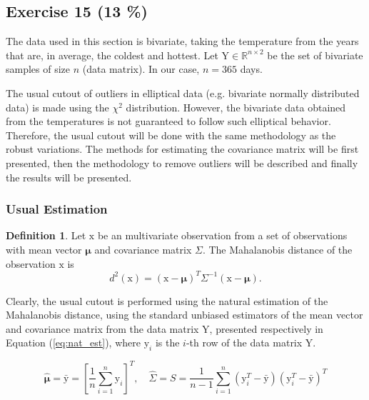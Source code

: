 \documentclass[11pt]{article}
\theoremstyle{definition}
\newtheorem{definition}{Definition}[section]
\theoremstyle{remark}
\theoremstyle{remark}
\begin{document}
\subsection*{Exercise 15 (13 \%)}
The data used in this section is bivariate, taking the temperature
from the years that are, in average, the coldest and hottest. Let
$\boldsymbol{\mathrm{Y}}\in\mathbb{R}^{n\times2}$ be the set of
bivariate samples of size $n$ (data matrix). In our case, $n=365$
days.


The usual cutout of outliers in elliptical data (e.g. bivariate
normally distributed data) is made using the $\chi^2$
distribution. However, the bivariate data obtained from the
temperatures is not guaranteed to follow such elliptical
behavior. Therefore, the usual cutout will be done with the same
methodology as the robust variations. The methods for estimating the
covariance matrix will be first presented, then the methodology to
remove outliers will be described and finally the results will be
presented.

\subsubsection*{Usual Estimation}
\begin{definition}
  Let $\boldsymbol{\mathrm{x}}$ be an multivariate observation from a
  set of observations with mean vector $\boldsymbol{\mu}$ and
  covariance matrix $\Sigma$. The Mahalanobis distance of the
  observation $\boldsymbol{\mathrm{x}}$ is
\begin{equation}\label{eq:mahal}
  d^2(\boldsymbol{\mathrm{x}}) = (\boldsymbol{\mathrm{x}} - \boldsymbol{\mu})^T\Sigma^{-1}(\boldsymbol{\mathrm{x}} - \boldsymbol{\mu}).
\end{equation}

\end{definition}

Clearly, the usual cutout is performed using the natural estimation of
the Mahalanobis distance, using the standard unbiased estimators of
the mean vector and covariance matrix from the data matrix
$\boldsymbol{\mathrm{Y}}$, presented respectively in Equation
(\ref{eq:nat_est}), where $\boldsymbol{\mathrm{y}}_i$ is the $i$-th
row of the data matrix $\boldsymbol{\mathrm{Y}}$.

\begin{equation}\label{eq:nat_est}
  \hat{\boldsymbol\mu}=\bar{\boldsymbol{\mathrm{y}}}=\left[\dfrac{1}{n}\sum_{i=1}^{n}\boldsymbol{\mathrm{y}}_i\right]^T,\quad \hat{\Sigma}=S=\dfrac{1}{n-1}\sum_{i=1}^{n} (\boldsymbol{\mathrm{y}}_i^T-\bar{\boldsymbol{\mathrm{y}}})(\boldsymbol{\mathrm{y}}_i^T-\bar{\boldsymbol{\mathrm{y}}})^T
\end{equation}
\end{document}
